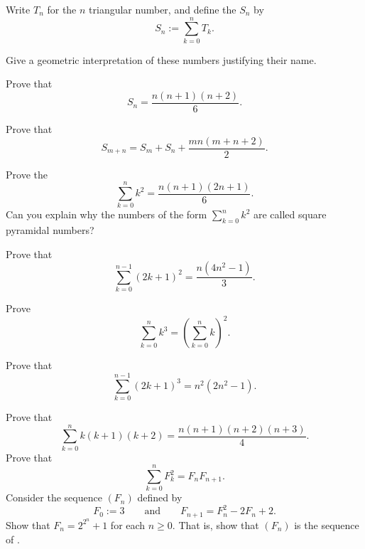 \begin{routine}
\begin{subexenum}
  \end{subexenum}
  \exercise Write $T_n$ for the $n$\supth{} triangular number, and define the  $S_n$ by
  \begin{equation*}
    S_n:=\sum_{k=0}^nT_k.
  \end{equation*}
  \begin{subexenum}
  \item Give a geometric interpretation of these numbers justifying their name.
  \item Prove that
    \begin{equation*}
      S_n = \frac{n(n+1)(n+2)}{6}.
    \end{equation*}
  \item Prove that
    \begin{equation*}
      S_{m+n}=S_m+S_n+\frac{mn(m+n+2)}{2}.
    \end{equation*}
  \end{subexenum}
  \exercise
  \begin{subexenum}
  \item
    Prove the 
    \begin{equation*}
      \sum_{k=0}^n k^2 = \frac{n(n+1)(2n+1)}{6}.
    \end{equation*}
    Can you explain why the numbers of the form $\sum_{k=0}^n k^2$ are called square pyramidal numbers?
  \item Prove that
    \begin{equation*}
      \sum_{k=0}^{n-1}(2k+1)^2 = \frac{n(4n^2-1)}{3}.
    \end{equation*}
  \end{subexenum}
  \exercise
  \begin{subexenum}
  \item Prove 
    \begin{equation*}
      \sum_{k=0}^n k^3 = \left(\sum_{k=0}^{n}k\right)^2.
    \end{equation*}
  \item Prove that
    \begin{equation*}
      \sum_{k=0}^{n-1}(2k+1)^3=n^2(2n^2-1).
    \end{equation*}
  \end{subexenum}
  \exercise Prove that
  \begin{equation*}
    \sum_{k=0}^n k(k+1)(k+2) = \frac{n(n+1)(n+2)(n+3)}{4}.
  \end{equation*}
  \exercise Prove that
  \begin{equation*}
    \sum_{k=0}^n F_k^2 = F_nF_{n+1}.
  \end{equation*}
  \exercise Consider the sequence $(F_n)$ defined by
  \begin{equation*}
    F_0:=3\qquad\text{and}\qquad F_{n+1}=F_n^2-2F_n+2.
  \end{equation*}
  Show that $F_n=2^{2^n}+1$ for each $n\geq 0$. That is, show that $(F_n)$ is the sequence of .
\end{routine}


